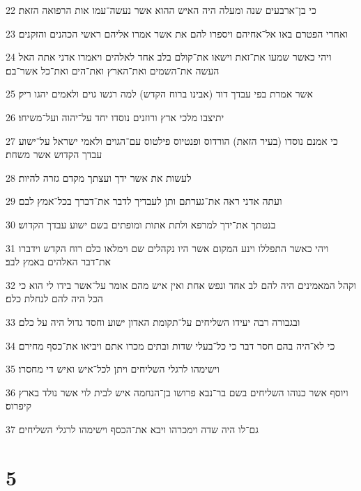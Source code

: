 \par 22 כי בן־ארבעים שנה ומעלה היה האיש ההוא אשר נעשה־עמו אות הרפואה הזאת׃
\par 23 ואחרי הפטרם באו אל־אחיהם ויספרו להם את אשר אמרו אליהם ראשי הכהנים והזקנים׃
\par 24 ויהי כאשר שמעו את־זאת וישאו את־קולם בלב אחד לאלהים ויאמרו אדני אתה האל העשה את־השמים ואת־הארץ ואת־הים ואת־כל אשר־בם׃
\par 25 אשר אמרת בפי עבדך דוד (אבינו ברוח הקדש) למה רגשו גוים ולאמים יהגו ריק׃
\par 26 יתיצבו מלכי ארץ ורוזנים נוסדו יחד על־יהוה ועל־משיחו׃
\par 27 כי אמנם נוסדו (בעיר הזאת) הורדוס ופנטיוס פילטוס עם־הגוים ולאמי ישראל על־ישוע עבדך הקדוש אשר משחת׃
\par 28 לעשות את אשר ידך ועצתך מקדם גזרה להיות׃
\par 29 ועתה אדני ראה את־גערתם ותן לעבדיך לדבר את־דברך בכל־אמץ לבם׃
\par 30 בנטתך את־ידך למרפא ולתת אתות ומופתים בשם ישוע עבדך הקדוש׃
\par 31 ויהי כאשר התפללו וינע המקום אשר היו נקהלים שם וימלאו כלם רוח הקדש וידברו את־דבר האלהים באמץ לבב׃
\par 32 וקהל המאמינים היה להם לב אחד ונפש אחת ואין איש מהם אומר על־אשר בידו לי הוא כי הכל היה להם לנחלת כלם׃
\par 33 ובגבורה רבה יעידו השליחים על־תקומת האדון ישוע וחסד גדול היה על כלם׃
\par 34 כי לא־היה בהם חסר דבר כי כל־בעלי שדות ובתים מכרו אתם ויביאו את־כסף מחירם׃
\par 35 וישימהו לרגלי השליחים ויתן לכל־איש ואיש די מחסרו׃
\par 36 ויוסף אשר כנוהו השליחים בשם בר־נבא פרושו בן־הנחמה איש לבית לוי אשר נולד בארץ קיפרוס׃
\par 37 גם־לו היה שדה וימכרהו ויבא את־הכסף וישימהו לרגלי השליחים׃

\chapter{5}

